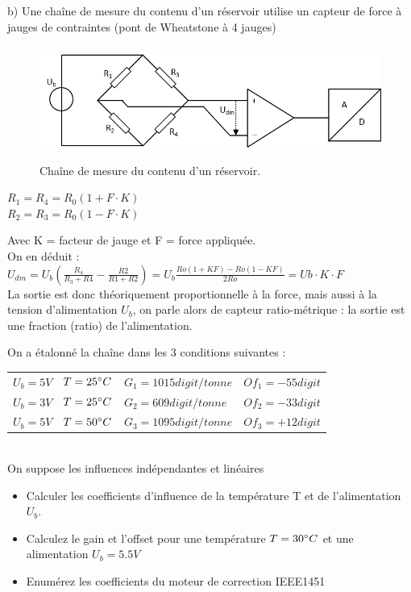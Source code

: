b)	Une chaîne de mesure du contenu d'un réservoir utilise un capteur de force à jauges de contraintes (pont de Wheatstone à 4 jauges)

\begin{figure}[h!]
\centering
\includegraphics[height=3.7cm]{assets/figures/Exercice_3_5_c.PNG}
\caption{Chaîne de mesure du contenu d'un réservoir.}
\label{fig:Exercice_3_5_c}
\end{figure}

\begin{center}
$R_1 = R_4 = R_0(1 + F \cdot K)$\\
$R_2 = R_3 = R_0(1 - F \cdot K)$\\
\end{center}

Avec K = facteur de jauge et F = force appliquée.\\

On en déduit :	$U_{dm} = U_b ( \frac{ R_4}{R_3+R4} - \frac{R2}{R1+R2} ) = U_b \frac{ Ro(1+KF) -Ro(1-KF)}{2Ro}  = Ub \cdot K \cdot F$ \\
La sortie est donc théoriquement proportionnelle à la force, mais aussi à la tension d'alimentation $U_b$, on parle alors de capteur ratio-métrique : la sortie est une fraction (ratio) de l'alimentation.

On a étalonné la chaîne dans les 3 conditions suivantes :\\

\begin {center}
\begin{tabular}{llll}
$U_b = 5V$ &	$T=25 \degree C$ &	$G_1 = 1015 digit/tonne$ &	$Of_1 = -55 digit$\\
$U_b = 3V$ &	$T=25 \degree C$ &	$G_2 = 609 digit/tonne$ &	$Of_2 = -33 digit$\\
$U_b = 5V$ &	$T=50 \degree C$ &	$G_3 = 1095 digit/tonne$ &	$Of_3 = +12 digit$\\
\end{tabular}
\end{center}
~\\
On suppose les influences indépendantes et linéaires

\begin{itemize}\itemsep1pt
\renewcommand{\labelitemi}{$\bullet$}
\item Calculer les coefficients d'influence de la température T et de l'alimentation $U_b$.
\item Calculez le gain et l'offset pour une température $T=30 \degree C$ et une alimentation $U_b=5.5V$
\item Enumérez les coefficients du moteur de correction IEEE1451
\end{itemize}

